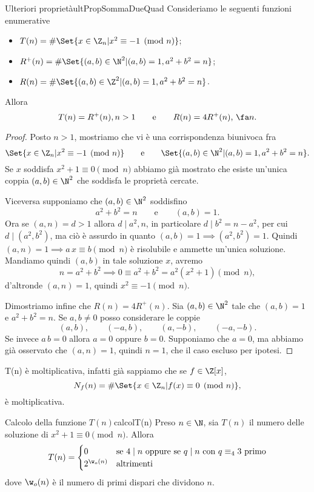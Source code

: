 \begin{teor}{Ulteriori proprietà}{ultPropSommaDueQuad}
	Consideriamo le seguenti funzioni enumerative
	\begin{itemize}
		\item \(T(n) = \#\Set{x\in \Z_n | x^2 \equiv -1 \pmod{n}}\);
		\item \(R^+(n) = \#\Set{(a,b) \in \N^2 | (a,b)=1, a^2+b^2=n}\);
		\item \(R(n) = \#\Set{(a,b) \in \Z^2 | (a,b)=1, a^2+b^2=n}\).
	\end{itemize}
	Allora
	\[
		T(n) = R^+(n),n>1 \qquad\text{e}\qquad R(n) = 4R^+(n),\,\fa n.
	\]
\end{teor}

\begin{proof}
	Posto \(n>1\), mostriamo che vi è una corrispondenza biunivoca fra
	\[
		\Set{x\in \Z_n | x^2 \equiv -1 \pmod{n}} \qquad\text{e}\qquad \Set{(a,b) \in \N^2 | (a,b)=1, a^2+b^2=n}.
	\]
	Se \(x\) soddisfa \(x^2+1\equiv 0 \pmod{n}\) abbiamo già mostrato che esiste un'unica coppia \((a,b)\in \N^2\) che soddisfa le proprietà cercate.

	Viceversa supponiamo che \((a,b)\in \N^2\) soddisfino
	\[
		a^2+b^2 = n \qquad\text{e}\qquad (a,b)=1.
	\]
	Ora se \((a,n)=d>1\) allora \(d\mid a^2,n\), in particolare \(d\mid b^2 = n-a^2\), per cui \(d\mid (a^2,b^2)\), ma ciò è assurdo in quanto \((a,b)=1 \implies (a^2,b^2)=1\).
	Quindi \((a,n)=1 \implies a\,x \equiv b \pmod{n}\) è risolubile e ammette un'unica soluzione.
	Mandiamo quindi \((a,b)\) in tale soluzione \(x\), avremo
	\[
		n=a^2+b^2 \implies 0 \equiv a^2+b^2 =a^2(x^2+1) \pmod{n},
	\]
	d'altronde \((a,n)=1\), quindi \(x^2 \equiv -1 \pmod{n}\).

	Dimostriamo infine che \(R(n)=4R^+(n)\).
	Sia \((a,b)\in\N^2\) tale che \((a,b)=1\) e \(a^2+b^2=n\).
	Se \(a,b\neq 0\) posso considerare le coppie
	\[
		(a,b), \qquad (-a,b), \qquad (a,-b), \qquad(-a,-b).
	\]
	Se invece \(a\,b = 0\) allora \(a=0\) oppure \(b=0\).
	Supponiamo che \(a=0\), ma abbiamo già osservato che \((a,n)=1\), quindi \(n=1\), che il caso escluso per ipotesi.
\end{proof}

\begin{oss}
	T(n) è moltiplicativa, infatti già sappiamo che se \(f\in \Z[x]\),
	\[
		N_f(n) = \#\Set{x\in \Z_n | f(x) \equiv 0 \pmod{n}},
	\]
	è moltiplicativa.
\end{oss}

\begin{prop}{Calcolo della funzione \(T(n)\)}{calcolT(n)}
	Preso \(n\in \N\), sia \(T(n)\) il numero delle soluzione di \(x^2+1 \equiv 0 \pmod{n}\).
	Allora
	\[
		T(n) =  \begin{cases}
			0           & \text{se \(4\mid n\) oppure se \(q\mid n\) con \(q\equiv_4 3\) primo} \\
			2^{\w_o(n)} & \text{altrimenti}
		\end{cases}
	\]
	dove \(\w_o(n)\) è il numero di primi dispari che dividono \(n\).
\end{prop}

